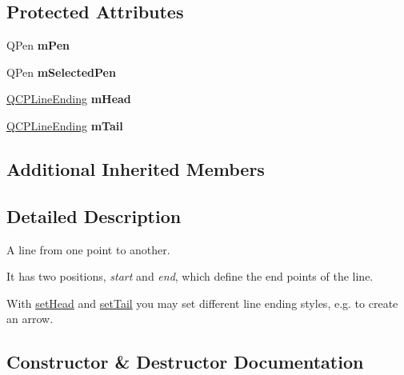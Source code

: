 \subsection*{Protected Attributes}
\begin{DoxyCompactItemize}
\item 
Q\+Pen {\bfseries m\+Pen}\hypertarget{class_q_c_p_item_line_abbb544d5bb927dfe4e81a7f3ca4c65ac}{}\label{class_q_c_p_item_line_abbb544d5bb927dfe4e81a7f3ca4c65ac}

\item 
Q\+Pen {\bfseries m\+Selected\+Pen}\hypertarget{class_q_c_p_item_line_aff858ad6dde3b90024814ca4b116f278}{}\label{class_q_c_p_item_line_aff858ad6dde3b90024814ca4b116f278}

\item 
\hyperlink{class_q_c_p_line_ending}{Q\+C\+P\+Line\+Ending} {\bfseries m\+Head}\hypertarget{class_q_c_p_item_line_a51603f28ab7ddb1c1a95ea384791d3ed}{}\label{class_q_c_p_item_line_a51603f28ab7ddb1c1a95ea384791d3ed}

\item 
\hyperlink{class_q_c_p_line_ending}{Q\+C\+P\+Line\+Ending} {\bfseries m\+Tail}\hypertarget{class_q_c_p_item_line_ab8ed61dfe15bbb1cbf9b95eae95e242f}{}\label{class_q_c_p_item_line_ab8ed61dfe15bbb1cbf9b95eae95e242f}

\end{DoxyCompactItemize}
\subsection*{Additional Inherited Members}


\subsection{Detailed Description}
A line from one point to another. 

 It has two positions, {\itshape start} and {\itshape end}, which define the end points of the line.

With \hyperlink{class_q_c_p_item_line_aebf3d687114d584e0459db6759e2c3c3}{set\+Head} and \hyperlink{class_q_c_p_item_line_ac264222c3297a7efe33df9345c811a5f}{set\+Tail} you may set different line ending styles, e.\+g. to create an arrow. 

\subsection{Constructor \& Destructor Documentation}
